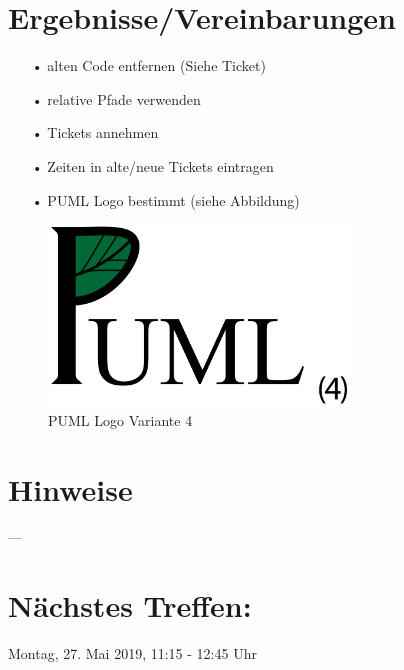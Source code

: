 \section*{Ergebnisse/Vereinbarungen}
\begin{itemize}
\item[•] alten Code entfernen (Siehe Ticket)
\item[•] relative Pfade verwenden
\item[•] Tickets annehmen
\item[•] Zeiten in alte/neue Tickets eintragen
\item[•] PUML Logo bestimmt (siehe Abbildung)
\end{itemize}
\begin{figure}
	\centering
	\includegraphics[width=8cm]{bilderMinutes/PLogo4}
	\caption{PUML Logo Variante 4}
\end{figure}
\section*{Hinweise}
---
\section*{Nächstes Treffen:}
Montag, 27. Mai 2019, 11:15 - 12:45 Uhr